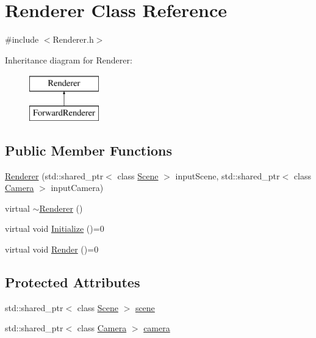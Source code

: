 \hypertarget{class_renderer}{}\section{Renderer Class Reference}
\label{class_renderer}


{\ttfamily \#include $<$Renderer.\+h$>$}

Inheritance diagram for Renderer\+:\begin{figure}[H]
\begin{center}
\leavevmode
\includegraphics[height=2.000000cm]{class_renderer}
\end{center}
\end{figure}
\subsection*{Public Member Functions}
\begin{DoxyCompactItemize}
\item 
\hyperlink{class_renderer_adc8ce31cd649bdf220ca8355809b1d06}{Renderer} (std\+::shared\+\_\+ptr$<$ class \hyperlink{class_scene}{Scene} $>$ input\+Scene, std\+::shared\+\_\+ptr$<$ class \hyperlink{class_camera}{Camera} $>$ input\+Camera)
\item 
virtual \hyperlink{class_renderer_afeee408862d5bd6255a6882d47e6d5cd}{$\sim$\+Renderer} ()
\item 
virtual void \hyperlink{class_renderer_a7cb221f355f181d84d66e8c09f50f04a}{Initialize} ()=0
\item 
virtual void \hyperlink{class_renderer_a38623da22aa718cfa41e2514ebd269f5}{Render} ()=0
\end{DoxyCompactItemize}
\subsection*{Protected Attributes}
\begin{DoxyCompactItemize}
\item 
std\+::shared\+\_\+ptr$<$ class \hyperlink{class_scene}{Scene} $>$ \hyperlink{class_renderer_a65178695d48824d3afd6fe40fd4915b6}{scene}
\item 
std\+::shared\+\_\+ptr$<$ class \hyperlink{class_camera}{Camera} $>$ \hyperlink{class_renderer_a7a08c6489c1ffe8e346b9f205b4014ca}{camera}
\end{DoxyCompactItemize}


